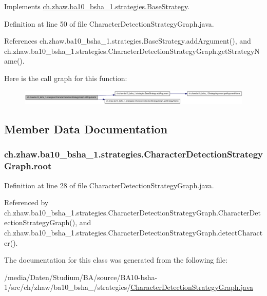 Implements \hyperlink{classch_1_1zhaw_1_1ba10__bsha__1_1_1strategies_1_1BaseStrategy_a0496e8fd0099a5f0f7765322d7e752a9}{ch.zhaw.ba10\_\-bsha\_\-1.strategies.BaseStrategy}.

Definition at line 50 of file CharacterDetectionStrategyGraph.java.

References ch.zhaw.ba10\_\-bsha\_\-1.strategies.BaseStrategy.addArgument(), and ch.zhaw.ba10\_\-bsha\_\-1.strategies.CharacterDetectionStrategyGraph.getStrategyName().

Here is the call graph for this function:\nopagebreak
\begin{figure}[H]
\begin{center}
\leavevmode
\includegraphics[width=420pt]{classch_1_1zhaw_1_1ba10__bsha__1_1_1strategies_1_1CharacterDetectionStrategyGraph_ab1ddc7964a2da79d65ca7227423ae8c6_cgraph}
\end{center}
\end{figure}


\subsection{Member Data Documentation}
\hypertarget{classch_1_1zhaw_1_1ba10__bsha__1_1_1strategies_1_1CharacterDetectionStrategyGraph_a8c963ad3d95559024da1e8f790e4710b}{
\subsubsection[{root}]{ {\bf ch.zhaw.ba10\_\-bsha\_\-1.strategies.CharacterDetectionStrategyGraph.root}}}
\label{classch_1_1zhaw_1_1ba10__bsha__1_1_1strategies_1_1CharacterDetectionStrategyGraph_a8c963ad3d95559024da1e8f790e4710b}


Definition at line 28 of file CharacterDetectionStrategyGraph.java.

Referenced by ch.zhaw.ba10\_\-bsha\_\-1.strategies.CharacterDetectionStrategyGraph.CharacterDetectionStrategyGraph(), and ch.zhaw.ba10\_\-bsha\_\-1.strategies.CharacterDetectionStrategyGraph.detectCharacter().

The documentation for this class was generated from the following file:\begin{DoxyCompactItemize}
\item 
/media/Daten/Studium/BA/source/BA10-\/bsha-\/1/src/ch/zhaw/ba10\_\-bsha\_/strategies/\hyperlink{CharacterDetectionStrategyGraph_8java}{CharacterDetectionStrategyGraph.java}\end{DoxyCompactItemize}
